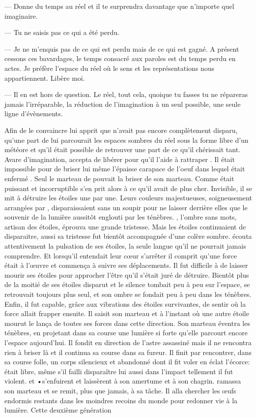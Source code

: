 --- Donne du temps au réel et il te surprendra davantage que n'importe quel imaginaire.

--- Tu ne saisis pas ce qui a été perdu. 

--- Je ne m'enquis pas de ce qui est perdu mais de ce qui est gagné. A présent cessons ces bavardages, le temps consacré aux paroles est du temps perdu en actes. Je préfère l'espace du réel où le sens et les représentations nous appartiennent. Libère moi.

--- Il en est hors de question. Le réel, tout cela, quoique tu fasses tu ne répareras jamais l'irréparable, la réduction de l'imagination à un seul possible, une seule ligne d'évènements.

Afin de le convaincre \Ogo lui apprit que \Mey n'avait pas encore complètement disparu, qu'une part de lui parcourait les espaces sombres du réel sous la forme libre d'un météore et qu'il était possible de retrouver une part de ce qu'il chérissait tant. Avare d'imagination, \Shuru accepta de libérer \Ogo pour qu'il l'aide à rattraper \Drisst. Il était impossible pour \Shuru de briser lui même l'épaisse carapace de l'oeuf dans lequel était enfermé \Ogo. Seul le marteau de \Carac pouvait la briser de son marteau. Comme \Carac était puissant et incorruptible \Shuru s'en prit alors à ce qu'il avait de plus cher. Invisible, il se mit à détruire les étoiles une par une. Leurs couleurs majestueuses, soigneusement arrangées par \Carac, disparaissaient sans un soupir pour ne laisser derrière elles que le souvenir de la lumière aussitôt englouti par les ténèbres. \Carac, l'ombre sans mots, artisan des étoiles, éprouva une grande tristesse. Mais les étoiles continuaient de disparaitre, aussi sa tristesse fut bientôt accompagnée d'une colère sombre. \Carac écouta attentivement la pulsation de ses étoiles, la seule langue qu'il ne pourrait jamais comprendre. Et lorsqu'il entendait leur cœur s'arrêter il comprit qu'une force était à l'œuvre et commença à suivre ses déplacements. Il fut difficile à \Carac de laisser mourir ses étoiles pour approcher l'être qu'il s'était juré de détruire. Bientôt plus de la moitié de ses étoiles disparut et le silence tombait peu à peu sur l'espace, \Carac se retrouvait toujours plus seul, et son ombre se fondait peu à peu dans les ténèbres. Enfin, il fut capable, grâce aux vibrations des étoiles survivantes, de sentir où la force allait frapper ensuite. Il saisit son marteau et à l'instant où une autre étoile mourut le lança de toutes ses forces dans cette direction. Son marteau éventra les ténèbres, en projetant dans sa course une lumière si forte qu'elle parcourt encore l'espace aujourd'hui. Il fondit en direction de l'astre assassiné mais il ne rencontra rien à briser là et il continua sa course dans sa fureur. Il finit par rencontrer, dans sa course folle, un corps silencieux et abandonné dont il fit voler en éclat l'écorce: \Ogo était libre, même s'il failli disparaître lui aussi dans l'impact tellement il fut violent. \Ogo et •\Shuru s'enfuirent et laissèrent \Carac à son amertume et à son chagrin. \Carac ramassa son marteau et se remit, plus que jamais, à sa tâche. Il alla chercher les œufs endormis restants dans les moindres recoins du monde pour redonner vie à la lumière. Cette deuxième génération 